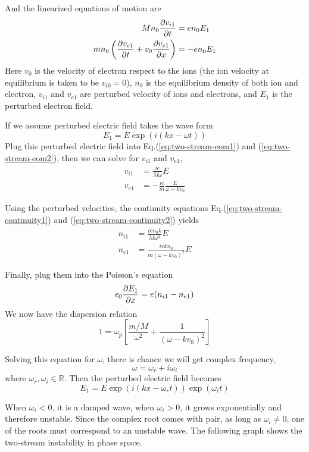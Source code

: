 And the linearized equations of motion are
\begin{align} 
	Mn_0\pdv{v_{i1}}{t} &= en_0E_1  \label{eq:two-stream-eom1} \\
	mn_0\left(\pdv{v_{e1}}{t} + v_0\pdv{v_{e1}}{x}\right) &= -en_0E_1 \label{eq:two-stream-eom2}
\end{align}
Here $v_0$ is the velocity of electron respect to the ions (the ion velocity at equilibrium is taken to be $v_{i0}=0$), $n_0$ is the equilibrium density of both ion and electron, $v_{i1}$ and $v_{e1}$ are perturbed velocity of ions and electrons, and $E_1$ is the perturbed electron field.

If we assume perturbed electric field takes the wave form
\[ E_1 = E\exp(i(kx-\omega t)) \]
Plug this perturbed electric field into Eq.(\ref{eq:two-stream-eom1}) and (\ref{eq:two-stream-eom2}), then we can solve for $v_{i1}$ and $v_{e1}$,
\begin{align*}
	v_{i1} &= \frac{ie}{M\omega} E \\
	v_{e1} &= -\frac{ie}{m}\frac{E}{\omega-kv_0}
\end{align*}

Using the perturbed velocities, the continuity equations Eq.(\ref{eq:two-stream-continuity1}) and (\ref{eq:two-stream-continuity2}) yields
\begin{align*}
	n_{i1} &= \frac{ien_0k}{M\omega^2} E \\
	n_{e1} &= \frac{iekn_0}{m(\omega-kv_0)^2}E
\end{align*}

Finally, plug them into the Poisson's equation
\[ \epsilon_0 \pdv{E_1}{x} = e(n_{i1}-n_{e1}) \]
We now have the dispersion relation
\[ 1 = \omega_p \left[\frac{m/M}{\omega^2}+\frac{1}{(\omega-kv_0)^2}\right] \]

Solving this equation for $\omega$, there is chance we will get complex frequency,
\[ \omega = \omega_r + i\omega_i \]
where $\omega_r, \omega_i \in\mathbb{R}$. Then the perturbed electric field becomes
\[ E_1 = E\exp(i(kx-\omega_rt))\exp(\omega_it) \]

When $\omega_i < 0$, it is a damped wave, when $\omega_i > 0$, it grows exponentially and therefore unstable. Since the complex root comes with pair, as long as $\omega_i\neq 0$, one of the roots must correspond to an unstable wave. The following graph shows the two-stream instability in phase space.

